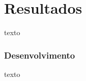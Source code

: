 
\chapter{Resultados\label{chap:Desenvolvimento}}


texto

\subsection{Desenvolvimento}

texto \cite{vogt2002multiple}


